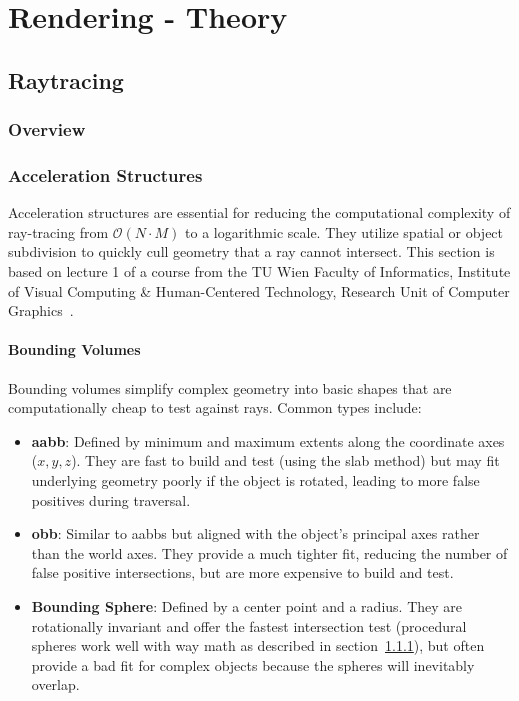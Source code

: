 \section{Rendering - Theory}\label{sec:rendering---theory}

\subsection{Raytracing}\label{subsec:raytracing}

\subsubsection{Overview}\label{subsubsec:rt-overview}

\subsubsection{Acceleration Structures}\label{subsubsec:acceleration-structures}

Acceleration structures are essential for reducing the computational complexity of ray-tracing
from $\mathcal{O}(N \cdot M)$ to a logarithmic scale.
They utilize spatial or object subdivision to quickly cull geometry that a ray cannot intersect.
This section is based on lecture 1 of a course from the TU Wien Faculty of Informatics,
Institute of Visual Computing \& Human-Centered Technology,
Research Unit of Computer Graphics~\cite{tuwien_rendering_2020}.

\paragraph{Bounding Volumes}\label{par:bounding-volumes}

Bounding volumes simplify complex geometry into basic shapes
that are computationally cheap to test against rays.
Common types include:

\begin{itemize}
    \item \textbf{\gls{aabb}}: {
        Defined by minimum and maximum extents along the coordinate axes ($x, y, z$).
        They are fast to build and test (using the slab method) but may fit underlying geometry poorly
        if the object is rotated, leading to more false positives during traversal.
    }
    \item \textbf{\gls{obb}}: {
        Similar to \glspl{aabb} but aligned with the object's principal axes rather than the world axes.
        They provide a much tighter fit, reducing the number of false positive intersections,
        but are more expensive to build and test.
    }
    \item \textbf{Bounding Sphere}: {
        Defined by a center point and a radius.
        They are rotationally invariant and offer the fastest intersection test
        (procedural spheres work well with way math as described in section~\ref{subsubsec:rt-overview}),
        but often provide a bad fit for complex objects because the spheres will inevitably overlap.
    }
\end{itemize}

